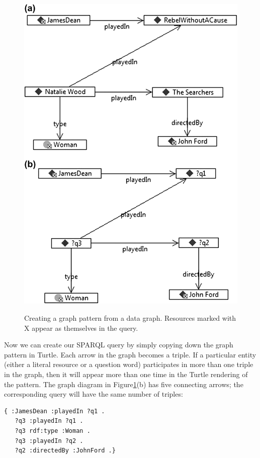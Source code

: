 \begin{figure}
\centering
\includegraphics[width=5in]{media/ch6/f06-07.png}
\label{fig:ch6.7}
\caption{Creating a graph pattern from a data graph. Resources marked with X appear as themselves in the query.}
\end{figure}


Now we can create our SPARQL query by simply copying down the graph
pattern in Turtle. Each arrow in the graph becomes a triple. If a
particular entity (either a literal resource or a question word)
participates in more than one triple in the graph, then it will appear
more than one time in the Turtle rendering of the pattern. The graph
diagram in Figure\ref{fig:ch6.7}(b) has five connecting arrows; the corresponding
query will have the same number of triples:

\begin{lstlisting}
{ :JamesDean :playedIn ?q1 .
   ?q3 :playedIn ?q1 .
   ?q3 rdf:type :Woman .
   ?q3 :playedIn ?q2 .
   ?q2 :directedBy :JohnFord .}
\end{lstlisting}

